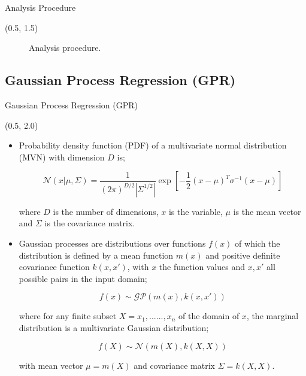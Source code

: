 \documentclass[10pt, xcolor={dvipsnames}, aspectratio = 169]{beamer}
\begin{document}
\begin{frame}{Analysis Procedure}

\begin{textblock}{14.0}(0.5, 1.5)

\begin{figure}
    \centering
    
    \caption{Analysis procedure.}
\end{figure}

\end{textblock}

\end{frame}


%
%

\subsection{Gaussian Process Regression (GPR)}

\begin{frame}[fragile]{Gaussian Process Regression (GPR)}

\begin{textblock}{14.0}(0.5, 2.0)

\begin{itemize}

\item Probability density function (PDF) of a multivariate normal distribution (MVN) with dimension $D$ is;

\begin{equation*}
\mathcal{N} (x| \mu, \Sigma) = \frac{1}{(2\pi)^{D/2} |\Sigma^{1/2}|} \exp\left[ -\frac{1}{2}(x - \mu)^{T}\sigma^{-1}(x - \mu)\right]
\end{equation*}

where $D$ is the number of dimensions, $x$ is the variable, $\mu$ is the mean vector and $\Sigma$ is the covariance matrix.

\item Gaussian processes are distributions over functions $f(x)$ of which the distribution is defined by a mean function
$m(x)$ and positive definite covariance function $k(x, x')$, with $x$ the function values and $x, x'$ all possible pairs
in the input domain;

\begin{equation*}
    f(x) \sim \mathcal{G}\mathcal{P}(m(x), k(x, x'))
\end{equation*}

where for any finite subset $X = {x_{1}, ......, x_{n}}$ of the domain of $x$, the marginal distribution is a
multivariate Gaussian distribution;

\begin{equation*}
f(X) \sim \mathcal{N}(m(X), k(X, X))
\end{equation*}

with mean vector $\mu = m(X)$ and covariance matrix $\Sigma = k(X, X)$.

\end{itemize}

\end{textblock}

\end{frame}
\end{document}
